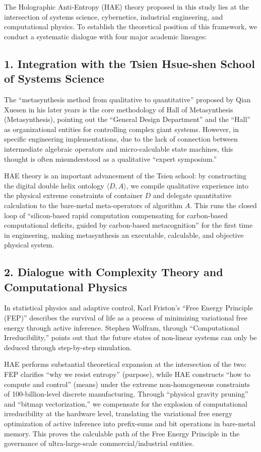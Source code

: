 \documentclass{article}
\begin{document}
The Holographic Anti-Entropy (HAE) theory proposed in this study lies at the intersection of systems science, cybernetics, industrial engineering, and computational physics. To establish the theoretical position of this framework, we conduct a systematic dialogue with four major academic lineages:

\subsection*{1. Integration with the Tsien Hsue-shen School of Systems Science}
The ``metasynthesis method from qualitative to quantitative'' proposed by Qian Xuesen in his later years is the core methodology of Hall of Metasynthesis (Metasynthesis), pointing out the ``General Design Department'' and the ``Hall'' as organizational entities for controlling complex giant systems. However, in specific engineering implementations, due to the lack of connection between intermediate algebraic operators and micro-calculable state machines, this thought is often misunderstood as a qualitative ``expert symposium.''

HAE theory is an important advancement of the Tsien school: by constructing the digital double helix ontology $\langle D, A \rangle$, we compile qualitative experience into the physical extreme constraints of container $D$ and delegate quantitative calculation to the bare-metal meta-operators of algorithm $A$. This runs the closed loop of ``silicon-based rapid computation compensating for carbon-based computational deficits, guided by carbon-based metacognition'' for the first time in engineering, making metasynthesis an executable, calculable, and objective physical system.

\subsection*{2. Dialogue with Complexity Theory and Computational Physics}
In statistical physics and adaptive control, Karl Friston's ``Free Energy Principle (FEP)'' describes the survival of life as a process of minimizing variational free energy through active inference. Stephen Wolfram, through ``Computational Irreducibility,'' points out that the future states of non-linear systems can only be deduced through step-by-step simulation.

HAE performs substantial theoretical expansion at the intersection of the two: FEP clarifies ``why we resist entropy'' (purpose), while HAE constructs ``how to compute and control'' (means) under the extreme non-homogeneous constraints of 100-billion-level discrete manufacturing. Through ``physical gravity pruning'' and ``bitmap vectorization,'' we compensate for the explosion of computational irreducibility at the hardware level, translating the variational free energy optimization of active inference into prefix-sums and bit operations in bare-metal memory. This proves the calculable path of the Free Energy Principle in the governance of ultra-large-scale commercial/industrial entities.
\end{document}
